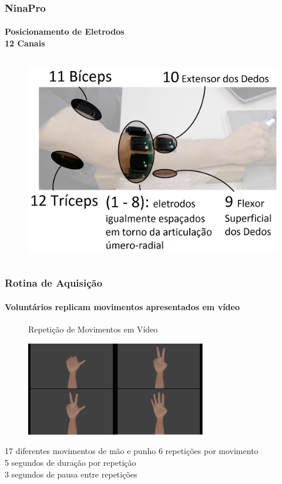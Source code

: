 \documentclass{beamer}
\begin{document}
	\begin{frame}
		\frametitle{NinaPro}
		\framesubtitle{Posicionamento de Eletrodos \\ 12 Canais}
		\begin{columns}[c]
			\column{\textwidth}
				\begin{figure}
					\begin{center}
						\includegraphics[width=.9\textwidth]{./img/eletrodos.png}
					\end{center}
				\end{figure}
		\end{columns}
	\end{frame}
	
	\begin{frame}
		\frametitle{Rotina de Aquisição}
		\framesubtitle{Voluntários replicam movimentos apresentados em vídeo}
		\begin{figure}
			Repetição de Movimentos em Vídeo
			\begin{center}
				\includegraphics[width=0.7\textwidth]{./img/scenes.png}
			\end{center}
		\end{figure}
		\begin{alertblock}{17 diferentes movimentos de mão e punho}
			6 repetições por movimento \\
			5 segundos de duração por repetição \\
			3 segundos de pausa entre repetições
		\end{alertblock}
	\end{frame}
	
\end{document}
